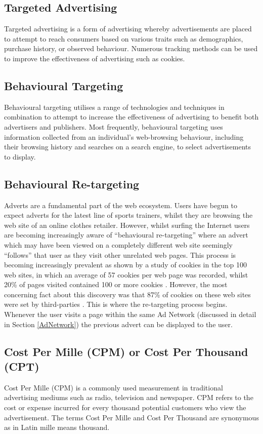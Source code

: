 \documentclass[12pt]{article}
\begin{document}
\subsection{Targeted Advertising}
Targeted advertising is a form of advertising whereby advertisements are placed to attempt to reach consumers based on various traits such as demographics, purchase history, or observed behaviour. Numerous tracking methods can be used to improve the effectiveness of advertising such as cookies. 

\subsection{Behavioural Targeting}
Behavioural targeting utilises a range of technologies and techniques in combination to attempt to increase the effectiveness of advertising to benefit both advertisers and publishers. Most frequently, behavioural targeting uses information collected from an individual’s web-browsing behaviour, including their browsing history and searches on a search engine, to select advertisements to display. 

\subsection{Behavioural Re-targeting}
Adverts are a fundamental part of the web ecosystem. Users have begun to expect adverts for the latest line of sports trainers, whilst they are browsing the web site of an online clothes retailer. However, whilst surfing the Internet users are becoming increasingly aware of ``behavioural re-targeting'' where an advert which may have been viewed on a completely different web site seemingly ``follows'' that user as they visit other unrelated web pages. This process is becoming increasingly prevalent as shown by a study of cookies in the top 100 web sites, in which an average of 57 cookies per web page was recorded, whilst 20\% of pages visited contained 100 or more cookies \parencite{taOffer}. However, the most concerning fact about this discovery was that 87\% of cookies on these web sites were set by third-parties \parencite{taOffer}. This is where the re-targeting process begins. Whenever the user visits a page within the same Ad Network (discussed in detail in Section \ref{AdNetwork}) the previous advert can be displayed to the user.

\subsection{Cost Per Mille (CPM) or Cost Per Thousand (CPT)} \label{cpm}
Cost Per Mille (CPM) is a commonly used measurement in traditional advertising mediums such as radio, television and newspaper. CPM refers to the cost or expense incurred for every thousand potential customers who view the advertisement. The terms Cost Per Mille and Cost Per Thousand are synonymous as in Latin mille means thousand. 
\end{document}
